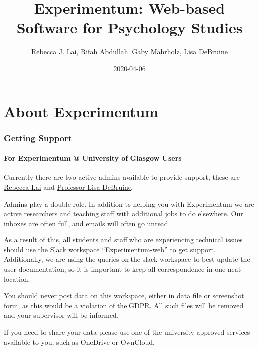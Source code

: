 \documentclass[]{book}
\title{Experimentum: Web-based Software for Psychology Studies}
\author{Rebecca J. Lai, Rifah Abdullah, Gaby Mahrholz, Lisa DeBruine}
\date{2020-04-06}
\begin{document}
\maketitle

{
\setcounter{tocdepth}{1}
\tableofcontents
}
\chapter*{About Experimentum}\label{about-experimentum}

\subsection*{Getting Support}\label{support}

\subsubsection*{For Experimentum @ University of Glasgow
Users}\label{for-experimentum-university-of-glasgow-users}

Currently there are two active admins available to provide support,
these are \href{mailto:rebecca.lai@glasgow.ac.uk}{Rebecca Lai} and
\href{mailto:lisa.debruine@glasgow.ac.uk}{Professor Lisa DeBruine}.

Admins play a double role. In addition to helping you with Experimentum
we are active researchers and teaching staff with additional jobs to do
elsewhere. Our inboxes are often full, and emails will often go unread.

As a result of this, all students and staff who are experiencing
technical issues should use the Slack workspace
\href{https://experimentum-web.slack.com/}{``Experimentum-web''} to get
support. Additionally, we are using the queries on the slack workspace
to best update the user documentation, so it is important to keep all
correspondence in one neat location.

\begin{rainbow}
You should never post data on this workspace, either in data file or
screenshot form, as this would be a violation of the GDPR. All such
files will be removed and your supervisor will be informed.

If you need to share your data please use one of the university approved
services available to you, such as OneDrive or OwnCloud.
\end{rainbow}
\end{document}
